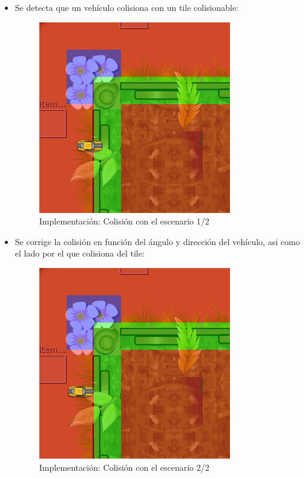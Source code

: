 \begin{itemize}
    \item Se detecta que un vehículo colisiona con un tile colisionable:
    \begin{figure}[H]
      \label{colision1}
      \begin{center}
        \includegraphics[scale=0.7]{imagenes/colision1.png}
      \end{center}
      \caption{Implementación: Colisión con el escenario 1/2}
    \end{figure}
    
    \item Se corrige la colisión en función del ángulo y dirección del vehículo, asi como el lado por el que colisiona del tile:
    \begin{figure}[H]
      \label{colision2}
      \begin{center}
        \includegraphics[scale=0.7]{imagenes/colision2.png}
      \end{center}
      \caption{Implementación: Colisión con el escenario 2/2}
    \end{figure}
    
\end{itemize}

